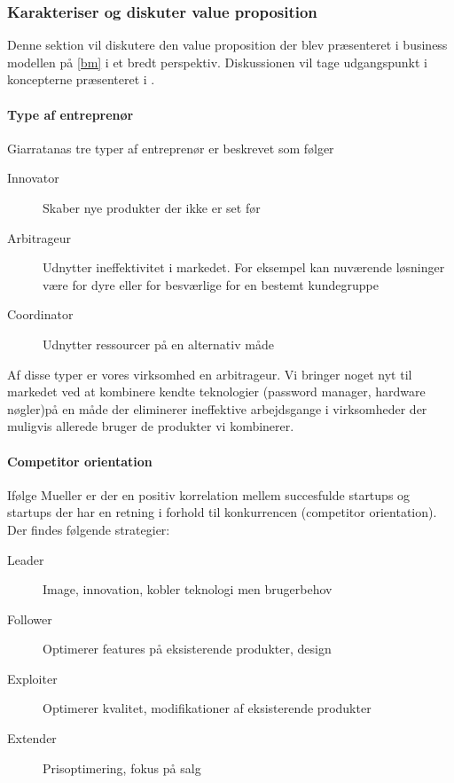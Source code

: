 \subsubsection{Karakteriser og diskuter value proposition}

Denne sektion vil diskutere den value proposition der blev præsenteret i business modellen på \cref{bm} i et bredt perspektiv.
Diskussionen vil tage udgangspunkt i koncepterne præsenteret i \citet[p.~40]{rose2012software}.

\paragraph{Type af entreprenør}
Giarratanas tre typer af entreprenør er beskrevet som følger

\begin{description}
	\item[Innovator] Skaber nye produkter der ikke er set før
	\item [Arbitrageur] Udnytter ineffektivitet i markedet. For eksempel kan nuværende løsninger være for dyre eller for besværlige for en bestemt kundegruppe
	\item [Coordinator] Udnytter ressourcer på en alternativ måde
\end{description}

Af disse typer er vores virksomhed en arbitrageur.  
Vi bringer noget nyt til markedet ved at kombinere kendte teknologier (password manager, hardware nøgler)på en måde der eliminerer ineffektive arbejdsgange i virksomheder der muligvis allerede bruger de produkter vi kombinerer.

\paragraph{Competitor orientation}
Ifølge Mueller \citep[p.~40]{rose2012software} er der en positiv korrelation mellem succesfulde startups og startups der har en retning i forhold til konkurrencen (competitor orientation).
Der findes følgende strategier:
\begin{description}
	\item[Leader] Image, innovation, kobler teknologi men brugerbehov
	\item[Follower] Optimerer features på eksisterende produkter, design
	\item [Exploiter] Optimerer kvalitet, modifikationer af eksisterende produkter
	\item [Extender] Prisoptimering, fokus på salg
\end{description}

